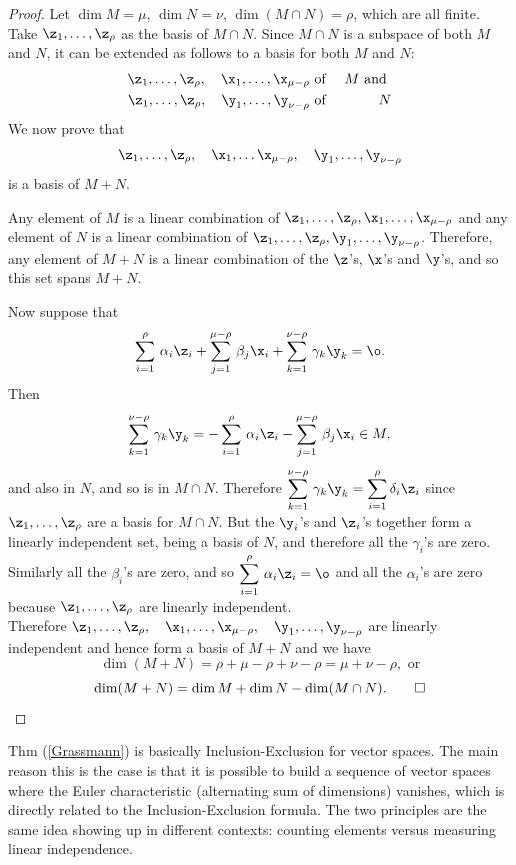 \begin{proof}
Let $\dim M = \mu$, $\dim N = \nu$, $\dim (M\cap N) = \rho$, which are all finite. Take $\z_1, \hdots, \z_\rho$ as the basis of $M\cap N$. Since $M\cap N$ is a subspace of both $M$ and $N$, it can be extended as follows to a basis for both $M$ and $N$: 
\begin{eqnarray*}
\z_1, \hdots, \z_\rho, \quad \x_1, \hdots, \x_{\mu - \rho} &\mbox{ of }& M \mbox{ and }\cr
\z_1, \hdots, \z_\rho, \quad \y_1, \hdots, \y_{\nu - \rho} &\mbox{ of }& N
\end{eqnarray*}
We now prove that 
\[ \z_1, \hdots, \z_\rho, \quad \x_1, \hdots \x_{\mu - \rho}, \quad \y_1, \hdots, \y_{\nu - \rho} \] is a basis of $M + N$. 

Any element of $M$ is a linear combination of $\z_1, \hdots, \z_\rho, \x_1, \hdots, \x_{\mu - \rho}$ and any element of $N$ is a linear combination of $\z_1, \hdots, \z_\rho, \y_1, \hdots, \y_{\nu - \rho}$. Therefore, any element of $M + N$ is a linear combination of the $\z$'s, $\x$'s and $\y$'s, and so this set spans $M + N$. 

Now suppose that \[ \sum_{i = 1}^\rho\, \alpha_i \z_i + \sum_{j = 1}^{\mu - \rho}\, \beta_j \x_i + \sum_{k = 1}^{\nu - \rho}\, \gamma_k \y_k = \o.\] Then   
\[      \sum_{k = 1}^{\nu - \rho}\, \gamma_k \y_k =  - \sum_{i = 1}^\rho\, \alpha_i \z_i - \sum_{j = 1}^{\mu - \rho}\, \beta_j \x_i  \in M,\] and also in $N$, and so is in $M\cap N$.
Therefore  $\displaystyle \sum_{k = 1}^{\nu - \rho}\, \gamma_k \y_k  = \sum_{i=1}^\rho \delta_i \z_i $ since $\z_1, \hdots, \z_\rho$ are a basis for $M\cap N$. But the $\y_i$'s and $\z_i$'s together form a linearly independent set, being a basis of $N$, and therefore all the $\gamma_i$'s are zero. Similarly all the $\beta_i$'s are zero, and so $\displaystyle \sum_{i = 1}^\rho \, \alpha_i \z_i = \o$ and all the $\alpha_i$'s are zero because $\z_1,\hdots,\z_\rho$ are linearly independent. \\

Therefore $\z_1, \hdots, \z_\rho, \quad \x_1, \hdots, \x_{\mu - \rho}, \quad \y_1, \hdots, \y_{\nu - \rho}$ are linearly independent and hence form a basis of $M + N$ and we have
\[ \dim(M+N) = \rho + \mu - \rho + \nu - \rho = \mu + \nu - \rho, \mbox{ or}\] 
\[ \dim(M + N) = \dim M + \dim N - \dim (M\cap N). \qed\]  
\end{proof}

Thm (\ref{Grassmann}) is basically Inclusion-Exclusion for vector spaces. The main reason this is the case is that it is possible to build a sequence of vector spaces where the Euler characteristic (alternating sum of dimensions) vanishes, which is directly related to the Inclusion-Exclusion formula. The two principles are the same idea showing up in different contexts: counting elements versus measuring linear independence.  